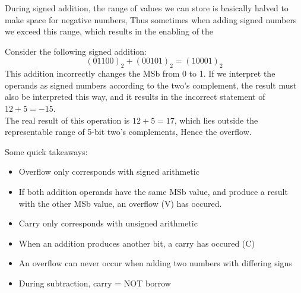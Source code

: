 \documentclass[]{report}
\newcommand{\keyword}[1]{{{\color{kwcol}{\hl{#1}}\,}}}
\begin{document}
During signed addition, the range of values we can store is basically halved to make space for negative numbers, Thus sometimes when adding signed numbers we exceed this range, which results in the enabling of the \keyword{overflow flag}

\begin{remark}
	Consider the following signed addition:
	\[	(01100)_2 + (00101)_2 = (10001)_2	\]
	This addition incorrectly changes the MSb from 0 to 1. If we interpret the operands as signed numbers according to the two's complement, the result must also be interpreted this way, and it results in the incorrect statement of $12+5=-15$.\\
	
	The real result of this operation is $12+5=17$, which lies outside the representable range of 5-bit two's complements, Hence the overflow.
\end{remark}

Some quick takeaways:
\begin{itemize}
	\item Overflow only corresponds with signed arithmetic
	\item If both addition operands have the same MSb value, and produce a result with the other MSb value, an overflow (V) has occured. 
	\item Carry only corresponds with unsigned arithmetic
	\item When an addition produces another bit, a carry has occured (C)
	\item An overflow can never occur when adding two numbers with differing signs
	\item During subtraction, carry = NOT borrow
\end{itemize}
\end{document}
